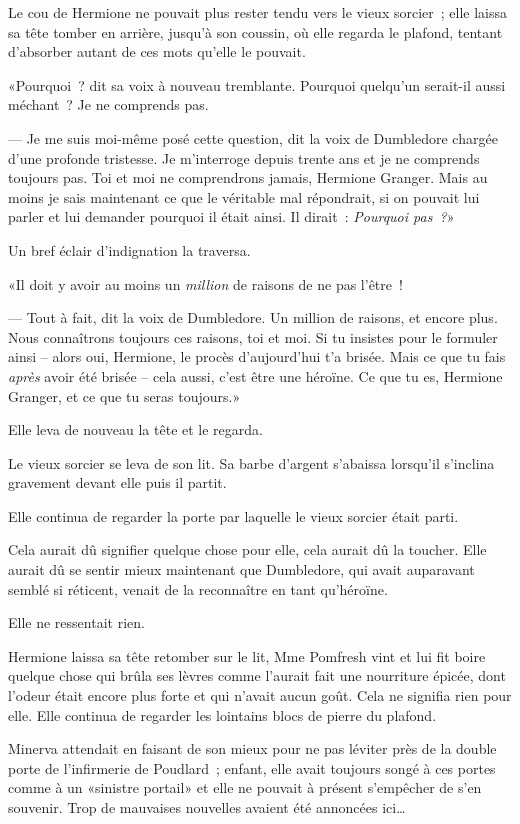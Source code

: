 Le cou de Hermione ne pouvait plus rester tendu vers le vieux sorcier~; elle laissa sa tête tomber en arrière, jusqu'à son coussin, où elle regarda le plafond, tentant d'absorber autant de ces mots qu'elle le pouvait.

«Pourquoi~? dit sa voix à nouveau tremblante. Pourquoi quelqu'un serait-il aussi méchant~? Je ne comprends pas.

--- Je me suis moi-même posé cette question, dit la voix de Dumbledore chargée d'une profonde tristesse. Je m'interroge depuis trente ans et je ne comprends toujours pas. Toi et moi ne comprendrons jamais, Hermione Granger. Mais au moins je sais maintenant ce que le véritable mal répondrait, si on pouvait lui parler et lui demander pourquoi il était ainsi. Il dirait~: \emph{Pourquoi pas~?}»

Un bref éclair d'indignation la traversa.

«Il doit y avoir au moins un \emph{million} de raisons de ne pas l'être~!

--- Tout à fait, dit la voix de Dumbledore. Un million de raisons, et encore plus. Nous connaîtrons toujours ces raisons, toi et moi. Si tu insistes pour le formuler ainsi -- alors oui, Hermione, le procès d'aujourd'hui t'a brisée. Mais ce que tu fais \emph{après} avoir été brisée -- cela aussi, c'est être une héroïne. Ce que tu es, Hermione Granger, et ce que tu seras toujours.»

Elle leva de nouveau la tête et le regarda.

Le vieux sorcier se leva de son lit. Sa barbe d'argent s'abaissa lorsqu'il s'inclina gravement devant elle puis il partit.

Elle continua de regarder la porte par laquelle le vieux sorcier était parti.

Cela aurait dû signifier quelque chose pour elle, cela aurait dû la toucher. Elle aurait dû se sentir mieux maintenant que Dumbledore, qui avait auparavant semblé si réticent, venait de la reconnaître en tant qu'héroïne.

Elle ne ressentait rien.

Hermione laissa sa tête retomber sur le lit, Mme Pomfresh vint et lui fit boire quelque chose qui brûla ses lèvres comme l'aurait fait une nourriture épicée, dont l'odeur était encore plus forte et qui n'avait aucun goût. Cela ne signifia rien pour elle. Elle continua de regarder les lointains blocs de pierre du plafond.

\later

Minerva attendait en faisant de son mieux pour ne pas léviter près de la double porte de l'infirmerie de Poudlard~; enfant, elle avait toujours songé à ces portes comme à un «sinistre portail» et elle ne pouvait à présent s'empêcher de s'en souvenir. Trop de mauvaises nouvelles avaient été annoncées ici…

